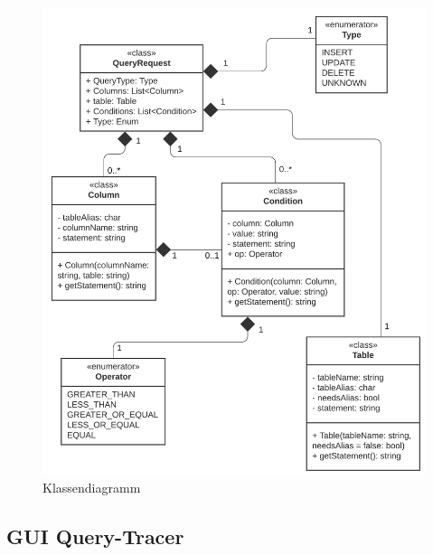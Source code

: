 \documentclass[11pt,toc=sectionentrywithoutdots, 
headheight=44pt, headings=optiontoheadandtoc, hyperfootnotes=false, hypertexnames=false]{scrartcl}
\begin{document}
 \begin{figure}[H]
 \centering

	\includegraphics{UML-Klasse.png}
	 \caption{Klassendiagramm}
 \end{figure}
 \clearpage
 
\subsection{GUI Query-Tracer}
 \label{fig:GUI Query-Tracer}
\end{document}
